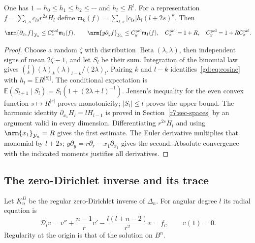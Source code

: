 \begin{lemma}\label{gd:lem:moments}
One has $1=h_0\le h_1\le h_2\le\cdots$ and $h_l\le R^l$.
For a representation $f=\sum_{l,s}c_{ls}r^{2s}H_l$ define
$\mathfrak m_k(f)=\sum_{l,s}|c_{ls}|h_l(l+2s)^k$.
Then
\begin{equation}\label{gd:eq:poly-derivatives}
 \nrm{\partial_{x_1}f}_{\mathcal Y_n}\le C_x^{\rm pol}\mathfrak m_1(f),
 \qquad
 \nrm{y\partial_yf}_{\mathcal Y_n}\le C_y^{\rm pol}\mathfrak m_1(f),
 \quad C_x^{\rm pol}=1+R,\quad C_y^{\rm pol}=1+RC_x^{\rm pol}.
\end{equation}
\end{lemma}
\begin{proof}
Choose a random $\zeta$ with distribution $\operatorname{Beta}(\lambda,\lambda)$,
then independent signs of mean $2\zeta-1$, and let $S_l$ be their sum.
Integration of the binomial law gives
$\binom lk(\lambda)_k(\lambda)_{l-k}/(2\lambda)_l$.
Pairing $k$ and $l-k$ identifies~\eqref{gd:eq:cosine} with
$h_l=\mathbb E R^{|S_l|}$.
The conditional expectation is
$\mathbb E(S_{l+1}\mid S_l)=S_l(1+(2\lambda+l)^{-1})$.
Jensen's inequality for the even convex function $s\mapsto R^{|s|}$
proves monotonicity; $|S_l|\le l$ proves the upper bound.
The harmonic identity $\partial_{x_1}H_l=lH_{l-1}$ is proved in
Section~\ref{r7:sec-spaces} by an argument valid in every dimension.
Differentiating $r^{2s}H_l$ and using
$\nrm{x_1}_{\mathcal Y_n}=R$ gives the first estimate.
The Euler derivative multiplies that monomial by $l+2s$;
$y\partial_y=r\partial_r-x_1\partial_{x_1}$ gives the second.
Absolute convergence with the indicated moments justifies all derivatives.
\end{proof}

\subsection{The zero-Dirichlet inverse and its trace}\label{gd:sec:Poisson}
Let $K_n^D$ be the regular zero-Dirichlet inverse of $\Delta_n$.
For angular degree $l$ its radial equation is
\[
 \mathcal D_lv=v''+\frac{n-1}{r}v'-\frac{l(l+n-2)}{r^2}v=f_l,
 \qquad v(1)=0.
\]
Regularity at the origin is that of the solution on $B^n$.

